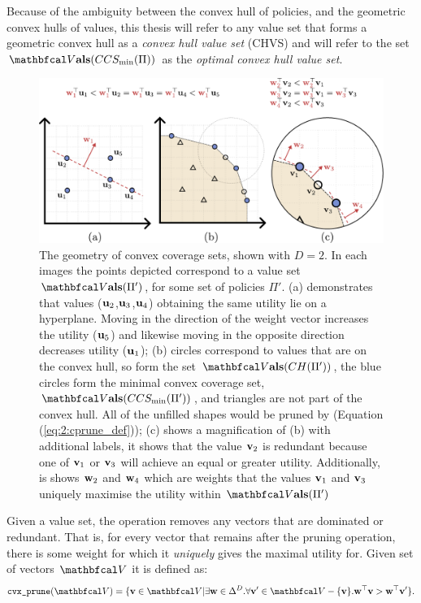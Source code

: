     Because of the ambiguity between the convex hull of policies, and the geometric convex hulls of values, this thesis will refer to any value set that forms a geometric convex hull as a \textit{convex hull value set} (CHVS) and will refer to the set $\valset(CCS_{\min}(\Pi))$ as the \textit{optimal convex hull value set}. 

    \begin{figure}
        \centering\includegraphics[width=1.0\textwidth]{figures/ch2/ch_geometry.pdf} 
        \caption[The geometry of convex coverage sets.]{The geometry of convex coverage sets, shown with $D=2$. In each images the points depicted correspond to a value set $\valset(\Pi')$, for some set of policies $\Pi'$. (a) demonstrates that values ($\mathbf{u}_2$,$\mathbf{u}_3$,$\mathbf{u}_4$) obtaining the same utility lie on a hyperplane. Moving in the direction of the weight vector increases the utility ($\mathbf{u}_5$) and likewise moving in the opposite direction decreases utility ($\mathbf{u}_1$); (b) circles correspond to values that are on the convex hull, so form the set $\valset(CH(\Pi'))$, the blue circles form the minimal convex coverage set, $\valset(CCS_{\min}(\Pi'))$, and triangles are not part of the convex hull. All of the unfilled shapes would be pruned by \cprune (Equation (\ref{eq:2:cprune_def})); (c) shows a magnification of (b) with additional labels, it shows that the value $\mathbf{v}_2$ is redundant because one of $\mathbf{v}_1$ or $\mathbf{v}_3$ will achieve an equal or greater utility. Additionally, is shows $\mathbf{w}_2$ and $\mathbf{w}_4$ which are weights that the values $\mathbf{v}_1$ and $\mathbf{v}_3$ uniquely maximise the utility within $\valset(\Pi')$}
        \label{fig:2:convex_hull_geometry} 
    \end{figure}

    Given a value set, the \cprune\ewe operation removes any vectors that are dominated or redundant. That is, for every vector that remains after the pruning operation, there is some weight for which it \textit{uniquely} gives the maximal utility for. Given set of vectors $\bfcl{V}$ it is defined as:
    \begin{align}
        \cprune(\bfcl{V}) = \{\bff{v}\in\bfcl{V} | \exists \bff{w}\in\Delta^D. \forall \bff{v}'\in\bfcl{V}-\{\bff{v}\}. \bff{w}^\top \bff{v} > \bff{w}^\top \bff{v}' \}. \label{eq:2:cprune_def}
    \end{align}

